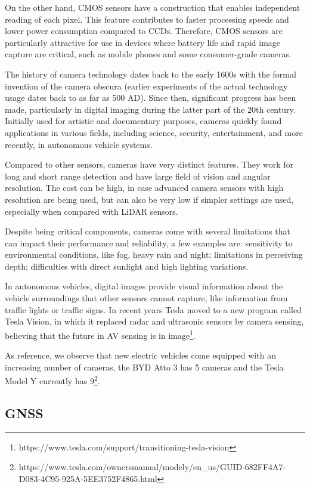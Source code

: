 On the other hand, CMOS sensors have a construction that enables independent reading of each pixel. This feature contributes to faster processing speeds and lower power consumption compared to CCDs. Therefore, CMOS sensors are particularly attractive for use in devices where battery life and rapid image capture are critical, such as mobile phones and some consumer-grade cameras.

The history of camera technology dates back to the early 1600s with the formal invention of the camera obscura (earlier experiments of the actual technology usage dates back to as far as 500 AD). Since then, significant progress has been made, particularly in digital imaging during the latter part of the 20th century. Initially used for artistic and documentary purposes, cameras quickly found applications in various fields, including science, security, entertainment, and more recently, in autonomous vehicle systems.

Compared to other sensors, cameras have very distinct features. They work for long and short range detection and have large field of vision and angular resolution. The cost can be high, in case advanced camera sensors with high resolution are being used, but can also be very low if simpler settings are used, especially when compared with LiDAR sensors.

Despite being critical components, cameras come with several limitations that can impact their performance and reliability, a few examples are: sensitivity to environmental conditions, like fog, heavy rain and night; limitations in perceiving depth; difficulties with direct sunlight and high lighting variations.

In autonomous vehicles, digital images provide visual information about the vehicle surroundings that other sensors cannot capture, like information from traffic lights or traffic signs. In recent years Tesla moved to a new program called Tesla Vision, in which it replaced radar and ultrasonic sensors by camera sensing, believing that the future in AV sensing is in image\footnote{https://www.tesla.com/support/transitioning-tesla-vision}.

As reference, we observe that new electric vehicles come equipped with an increasing number of cameras, the BYD Atto 3 has 5 cameras and the Tesla Model Y currently has 9\footnote{https://www.tesla.com/ownersmanual/modely/en\_us/GUID-682FF4A7-D083-4C95-925A-5EE3752F4865.html}.

\subsection{GNSS}

